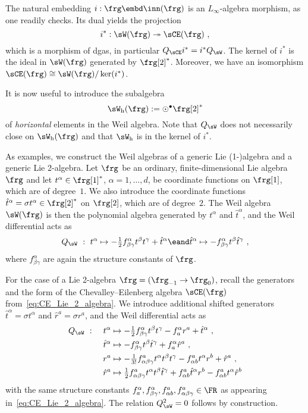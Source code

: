 \documentclass[reqno,a4paper,11pt]{article}
\begin{document}
The natural embedding $i:\frg\embd \inn(\frg)$ is an $L_\infty$-algebra morphism, as one readily checks. Its dual yields the projection
\begin{equation}
 i^*:\sW(\frg)\twoheadrightarrow\sCE(\frg)~,
\end{equation}
which is a morphism of dgas, in particular $Q_{\sCE} i^*=i^*Q_{\sW}$. The kernel of $i^*$ is the ideal in $\sW(\frg)$ generated by $\frg[2]^*$. Moreover, we have an isomorphism $\sCE(\frg)\cong \sW(\frg)/\ker(i^*)$.

It is now useful to introduce the subalgebra 
\begin{equation}
 \sW_{\rm h}(\frg):=\odot^\bullet\frg[2]^*
\end{equation}
of {\em horizontal} elements in the Weil algebra. Note that $Q_\sW$ does not necessarily close on $\sW_{\rm h}(\frg)$ and that $\sW_{\rm h}$ is in the kernel of $i^*$.

As examples, we construct the Weil algebras of a generic Lie (1-)algebra and a generic Lie 2-algebra. Let $\frg$ be an ordinary, finite-dimensional Lie algebra $\frg$ and let $t^\alpha\in \frg[1]^*$, $\alpha=1,\dots,d$, be coordinate functions on $\frg[1]$, which are of degree~$1$. We also introduce the coordinate functions $\hat t^\alpha=\sigma t^\alpha\in\frg[2]^*$ on $\frg[2]$, which are of degree~$2$. The Weil algebra $\sW(\frg)$ is then the polynomial algebra generated by $t^\alpha$ and $\hat t^\alpha$, and the Weil differential acts as
\begin{equation}\label{eq:Weil_of_ordinary_Lie}
Q_\sW~:~t^\alpha \mapsto -\tfrac12 f^\alpha_{\beta\gamma} t^\beta t^\gamma + \hat t^\alpha \eand
\hat t^\alpha\mapsto -f^\alpha_{\beta\gamma} t^\beta \hat t^\gamma~,
\end{equation}
where $f^\alpha_{\beta\gamma}$ are again the structure constants of $\frg$. 

For the case of a Lie 2-algebra $\frg=(\frg_{-1}\rightarrow \frg_0)$, recall the generators and the form of the Chevalley--Eilenberg algebra $\sCE(\frg)$ from~\eqref{eq:CE_Lie_2_algebra}. We introduce additional shifted generators $\hat t^\alpha=\sigma t^\alpha$ and $\hat r^a=\sigma r^a$, and the Weil differential acts as
\begin{equation}\label{eq:Weil_algebra_generic_Lie_2}
 \begin{aligned}
   Q_\sW~&:~&t^\alpha &\mapsto -\tfrac12 f^\alpha_{\beta\gamma} t^\beta t^\gamma-f^\alpha_a r^a+\hat t^\alpha~,\\
   &&\hat t^\alpha&\mapsto -f^\alpha_{\beta\gamma}t^\beta \hat t^\gamma+f^\alpha_a \hat r^a~,\\
   &&r^a&\mapsto-\tfrac1{3!}f^a_{\alpha\beta\gamma}t^\alpha t^\beta t^\gamma-f^a_{\alpha b}t^\alpha r^b+\hat r^a~,\\
   &&\hat r^a&\mapsto \tfrac12 f^a_{\alpha\beta\gamma}t^\alpha t^\beta \hat t^\gamma+f^a_{\alpha b}\hat t^\alpha r^b-f^a_{\alpha b}t^\alpha \hat r^b
 \end{aligned}
\end{equation}
with the same structure constants $f^\alpha_a, f^\alpha_{\beta\gamma},f^a_{\alpha b}, f^a_{\alpha\beta\gamma}\in \FR$ as appearing in~\eqref{eq:CE_Lie_2_algebra}. The relation $Q_\sW^2=0$ follows by construction.
\end{document}
